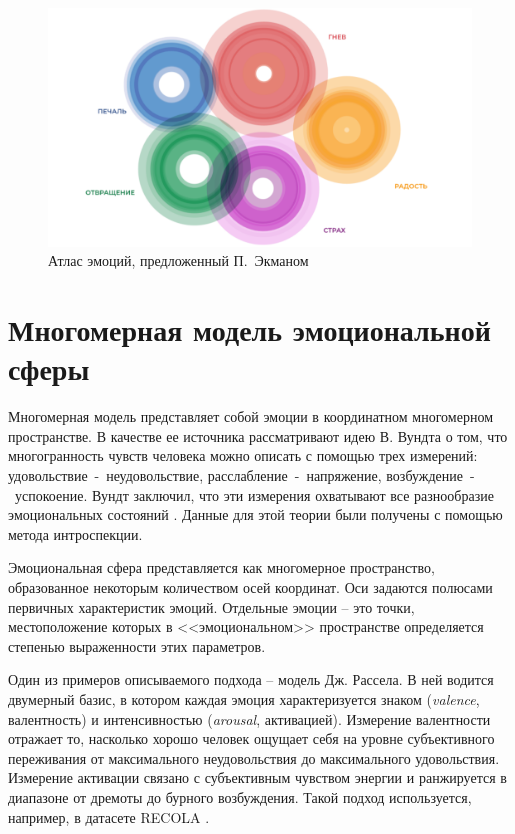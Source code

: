 \begin{figure}[H]
	\centering
	\includegraphics[width=\linewidth]{assets/emo-atlas}
	\caption{Атлас эмоций, предложенный П.~Экманом}
	\label{fig:emo-atlas}
\end{figure}

\section{Многомерная модель эмоциональной сферы}
Многомерная модель представляет собой эмоции в координатном многомерном пространстве. В качестве ее источника рассматривают идею В. Вундта о том, что многогранность чувств
человека можно описать с помощью трех измерений: удовольствие~-~неудовольствие, расслабление~-~напряжение, возбуждение~-~успокоение. Вундт заключил, что эти измерения охватывают все разнообразие эмоциональных состояний \cite{Вундт1984}. Данные для этой теории были получены с помощью метода интроспекции.

Эмоциональная сфера представляется как многомерное пространство, образованное некоторым
количеством осей координат. Оси задаются полюсами первичных характеристик эмоций. Отдельные эмоции -- это точки, местоположение которых в <<эмоциональном>> пространстве определяется степенью выраженности этих параметров.

Один из примеров описываемого подхода -- модель Дж. Рассела. В ней водится двумерный базис, в котором каждая эмоция характеризуется знаком (\textit{valence}, валентность) и интенсивностью (\textit{arousal}, активацией). Измерение валентности отражает то,
насколько хорошо человек ощущает себя на уровне субъективного переживания от максимального неудовольствия до максимального удовольствия. Измерение активации связано с
субъективным чувством энергии и ранжируется в диапазоне от дремоты до бурного возбуждения. Такой подход используется, например, в датасете RECOLA \cite{RECOLA}.

